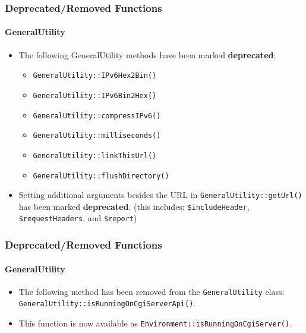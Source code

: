 \begin{frame}[fragile]
	\frametitle{Deprecated/Removed Functions}
	\framesubtitle{GeneralUtility}

	\begin{itemize}
		\item The following GeneralUtility methods have been marked \textbf{deprecated}:
			\begin{itemize}\smaller
				\item \texttt{GeneralUtility::IPv6Hex2Bin()}
				\item \texttt{GeneralUtility::IPv6Bin2Hex()}
				\item \texttt{GeneralUtility::compressIPv6()}
				\item \texttt{GeneralUtility::milliseconds()}
				\item \texttt{GeneralUtility::linkThisUrl()}
				\item \texttt{GeneralUtility::flushDirectory()}
			\end{itemize}\normalsize
			\vspace{0.4cm}

		\item Setting additional arguments besides the URL in \texttt{GeneralUtility::getUrl()}
			has been marked \textbf{deprecated}.\newline
			\smaller
				(this includes: \texttt{\$includeHeader}, \texttt{\$requestHeaders}, and \texttt{\$report})
			\normalsize

	\end{itemize}

\end{frame}


\begin{frame}[fragile]
	\frametitle{Deprecated/Removed Functions}
	\framesubtitle{GeneralUtility}

	\begin{itemize}
		\item The following method has been removed from the \texttt{GeneralUtility} class:
			\texttt{GeneralUtility::isRunningOnCgiServerApi()}.
		\item This function is now available as\newline
			\texttt{Environment::isRunningOnCgiServer()}.

	\end{itemize}

\end{frame}

